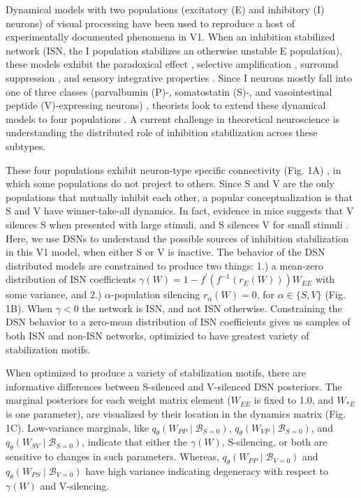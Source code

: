 Dynamical models with two populations (excitatory (E) and inhibitory (I) neurons) of visual processing have been used to reproduce a host of experimentally documented phenomena in V1.   When an inhibition stabilized network (ISN, the I population stabilizes an otherwise unstable E population), these models exhibit the paradoxical effect \cite{tsodyks1997paradoxical}, selective amplification \cite{murphy2009balanced}, surround suppression \cite{ozeki2009inhibitory}, and  sensory integrative properties \cite{rubin2015stabilized}.  Since I neurons mostly fall into one of three classes (parvalbumin (P)-, somatostatin (S)-, and vasointestinal peptide (V)-expressing neurons) \cite{markram2004interneurons, rudy2011three}, theorists look to extend these dynamical models to four populations \cite{litwin2016inhibitory}.  A current challenge in theoretical neuroscience is understanding the distributed role of inhibition stabilization across these subtypes.  

These four populations exhibit neuron-type specific connectivity (Fig. 1A) \cite{pfeffer2013inhibition}, in which some populations do not project to others.  Since S and V are the only populations that mutually inhibit each other, a popular conceptualization is that S and V have winner-take-all dynamics.  In fact, evidence in mice suggests that V silences S when presented with large stimuli, and S silences V for small stimuli \cite{dipoppa2018vision}.  Here, we use DSNs to understand the possible sources of inhibition stabilization in this V1 model, when either S or V is inactive.  The behavior of the DSN distributed models are constrained to produce two things: 1.) a mean-zero distribution of ISN coefficients $\gamma(W) = 1 - f^{'}(f^{-1}(r_E(W)))W_{EE}$ with some variance, and 2.) $\alpha$-population silencing $r_\alpha(W) = 0$, for $\alpha \in \{ S, V \}$ (Fig. 1B).  When $\gamma < 0$ the network is ISN, and not ISN otherwise.  Constraining the DSN behavior to a zero-mean distribution of ISN coefficients gives us samples of both ISN and non-ISN networks, optimizied to have greatest variety of stabilization motifs.

When optimized to produce a variety of stabilization motifs, there are informative differences between S-silenced and V-silenced DSN posteriors.  The marginal posteriors for each weight matrix element ($W_{EE}$ is fixed to 1.0, and $W_{*E}$ is one parameter), are visualized by their location in the dynamics matrix (Fig. 1C).  Low-variance marginals, like $q_\theta(W_{PP} \mid \mathcal{B}_{S=0})$, $q_\theta(W_{VP} \mid \mathcal{B}_{S=0})$, and $q_\theta(W_{SV} \mid \mathcal{B}_{S=0})$, indicate that either the $\gamma(W)$, S-silencing, or both are sensitive to changes in such parameters.  Whereas, $q_\theta(W_{PP} \mid \mathcal{B}_{V=0})$ and $q_\theta(W_{PS} \mid \mathcal{B}_{V=0})$ have high variance indicating degeneracy with respect to $\gamma(W)$ and V-silencing. 

